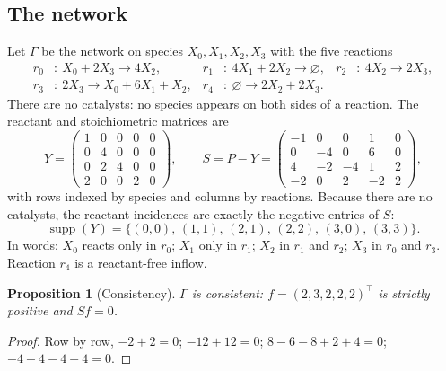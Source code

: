 \documentclass[11pt,a4paper]{article}
\newtheorem{proposition}[theorem]{Proposition}
\theoremstyle{definition}
\theoremstyle{remark}
\newcommand{\supp}{\operatorname{supp}}
\begin{document}
\subsection{The network}

Let $\Gamma$ be the network on species $X_0,X_1,X_2,X_3$ with the five reactions
\begin{equation}\label{eq:reactions}
\begin{aligned}
r_0&:\ X_0+2X_3\longrightarrow 4X_2, &
r_1&:\ 4X_1+2X_2\longrightarrow\varnothing, &
r_2&:\ 4X_2\longrightarrow 2X_3,\\
r_3&:\ 2X_3\longrightarrow X_0+6X_1+X_2, &
r_4&:\ \varnothing\longrightarrow 2X_2+2X_3 .
\end{aligned}
\end{equation}
There are no catalysts: no species appears on both sides of a reaction. The reactant and stoichiometric matrices are
\begin{equation}\label{eq:S}
Y=\begin{pmatrix}
1&0&0&0&0\\ 0&4&0&0&0\\ 0&2&4&0&0\\ 2&0&0&2&0
\end{pmatrix},\qquad
S=P-Y=\begin{pmatrix}
-1&0&0&1&0\\ 0&-4&0&6&0\\ 4&-2&-4&1&2\\ -2&0&2&-2&2
\end{pmatrix},
\end{equation}
with rows indexed by species and columns by reactions. Because there are no catalysts, the reactant incidences are exactly the negative entries of $S$:
\begin{equation}\label{eq:support}
\supp(Y)=\{(0,0),\,(1,1),\,(2,1),\,(2,2),\,(3,0),\,(3,3)\}.
\end{equation}
In words: $X_0$ reacts only in $r_0$; $X_1$ only in $r_1$; $X_2$ in $r_1$ and $r_2$; $X_3$ in $r_0$ and $r_3$. Reaction $r_4$ is a reactant-free inflow.

\begin{proposition}[Consistency]\label{prop:consistent}
$\Gamma$ is consistent: $f=(2,3,2,2,2)^{\top}$ is strictly positive and $Sf=0$.
\end{proposition}

\begin{proof}
Row by row, $-2+2=0$; $-12+12=0$; $8-6-8+2+4=0$; $-4+4-4+4=0$.
\end{proof}
\end{document}

